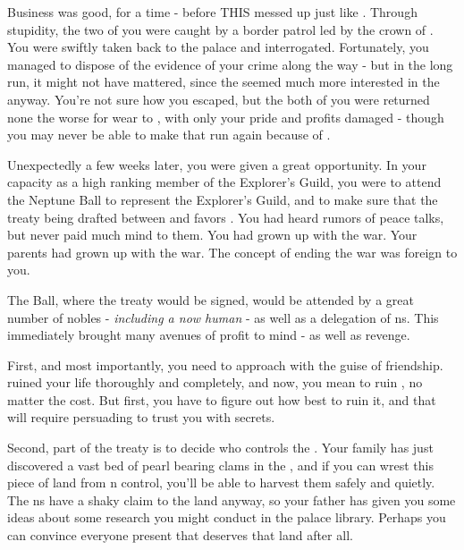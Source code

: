 \documentclass[char]{NeptuneBall}
\begin{document}
Business was good, for a time - before THIS \cPrincess{\prince} messed up just like \cPrincess{\their} \cAriel{\sibling}. Through \cPrincess{\their} stupidity, the two of you were caught by a border patrol led by the crown \cPrince{\Prince} of \pPacifica{} \cPrince{\themself}. You were swiftly taken back to the palace and interrogated. Fortunately, you managed to dispose of the evidence of your crime along the way - but in the long run, it might not have mattered, since the \cPrince{\prince} seemed much more interested in the \cPrincess{\prince} anyway. You're not sure how you escaped, but the both of you were returned none the worse for wear to \pAtlantis{}, with only your pride and profits damaged - though you may never be able to make that run again because of \emph{\cPrincess{\them}}.
 
Unexpectedly a few weeks later, you were given a great opportunity. In your capacity as a high ranking member of the Explorer's Guild, you were to attend the Neptune Ball to represent the Explorer's Guild, and to make sure that the treaty being drafted between \pPacifica{} and \pAtlantis{} favors \pAtlantis{}. You had heard rumors of peace talks, but never paid much mind to them. You had grown up with the war. Your parents had grown up with the war. The concept of ending the war was foreign to you. 

The \cExExKing{} Ball, where the treaty would be signed, would be attended by a great number of nobles - \emph{including a now human \cAriel{}} - as well as a delegation of \pPacifica{}ns. This immediately brought many avenues of profit to mind - as well as revenge.

First, and most importantly, you need to approach \cAriel{} with the guise of friendship. \cAriel{\They} ruined your life thoroughly and completely, and now, you mean to ruin \cAriel{\theirs}, no matter the cost. But first, you have to figure out how best to ruin it, and that will require persuading \cAriel{} to trust you with \cAriel{\their} secrets.

Second, part of the treaty is to decide who controls the \pGazaStrip{}. Your family has just discovered a vast bed of pearl bearing clams in the \ptrench{}, and if you can wrest this piece of land from \pPacifica{}n control, you'll be able to harvest them safely and quietly. The \pPacifica{}ns have a shaky claim to the land anyway, so your father has given you some ideas about some research you might conduct in the palace library. Perhaps you can convince everyone present that \pAtlantis{} deserves that land after all.
\end{document}

